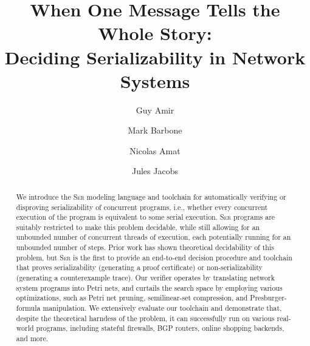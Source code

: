 \documentclass[a4paper]{llncs}
\title{When One Message Tells the Whole Story:\\ Deciding Serializability in Network Systems}
\author{
			Guy Amir \and
			Mark Barbone \and
			Nicolas Amat \and
			Jules Jacobs
		}
\institute{}
\newcommand{\toolname}{\textsc{Ser}}
\let\oldmaketitle\maketitle
\renewcommand{\maketitle}{
  \oldmaketitle
  \pagestyle{plain}  %
  \thispagestyle{plain}  %
}
\begin{document}
\raggedbottom


%	

\maketitle

\begin{abstract}
	We introduce the \toolname{} modeling language and toolchain for automatically verifying or disproving serializability of concurrent programs, i.e., whether every concurrent execution of the program is equivalent to some serial execution.
	\toolname{} programs are suitably restricted to make this problem decidable, while still allowing for an unbounded number of concurrent threads of execution, each potentially running for an unbounded number of steps.
	Prior work has shown theoretical decidability of this problem, but \toolname{} is the first to provide an end-to-end decision procedure and toolchain that proves serializability (generating a proof certificate) or non-serializability (generating a counterexample trace).
	Our verifier operates by translating network system programs into Petri nets, and curtails the search space by employing various optimizations, such as Petri net pruning, semilinear-set compression, and Presburger-formula manipulation.
	We extensively evaluate our toolchain and demonstrate that, despite the theoretical harndess of the problem, it can successfully run on various real-world programs, including stateful firewalls, BGP routers, online shopping backends, and more.
\end{abstract}











\newpage

{
	
	
}

\newpage











\end{document}
